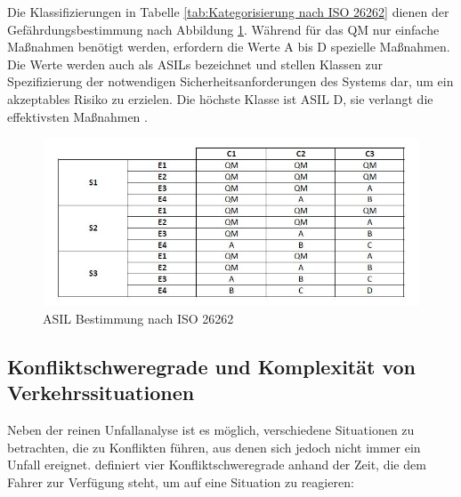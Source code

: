 Die Klassifizierungen in Tabelle \ref{tab:Kategorisierung nach ISO 26262} dienen der Gefährdungsbestimmung nach Abbildung \ref{fig:ISO 26262}. Während für das \ac{QM} nur einfache Maßnahmen benötigt werden, erfordern die Werte A bis D spezielle Maßnahmen. Die Werte werden auch als \acp{ASIL} bezeichnet und stellen Klassen zur Spezifizierung der notwendigen Sicherheitsanforderungen des Systems dar, um ein akzeptables Risiko zu erzielen. Die höchste Klasse ist \acs{ASIL} D, sie verlangt die effektivsten Maßnahmen \parencite[S.94ff]{Hillenbrand.2012}.

\begin{savenotes}
	\begin{figure}[H]
		\centering
		\includegraphics[width=12cm,height=5cm]{figures/ISO_26262}
		\caption[ASIL Bestimmung nach ISO 26262]{ASIL Bestimmung nach ISO 26262 \parencite[S. 96]{Hillenbrand.2012}}\label{fig:ISO 26262}
	\end{figure}
\end{savenotes}

\subsection{Konfliktschweregrade und Komplexität von Verkehrssituationen}
Neben der reinen Unfallanalyse ist es möglich, verschiedene Situationen zu betrachten, die zu Konflikten führen, aus denen sich jedoch nicht immer ein Unfall ereignet. \Textcite[S. 28]{Erke.1978} definiert vier Konfliktschweregrade anhand der Zeit, die dem Fahrer zur Verfügung steht, um auf eine Situation zu reagieren:

